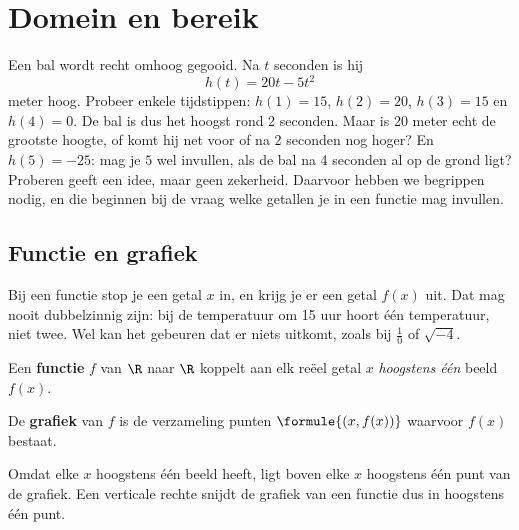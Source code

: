 \section{Domein en bereik}

Een bal wordt recht omhoog gegooid. Na $t$ seconden is hij
\[h(t) = 20t - 5t^2\]
meter hoog. Probeer enkele tijdstippen: $h(1) = 15$, $h(2) = 20$, $h(3) = 15$ en $h(4) = 0$. De bal is dus het hoogst rond 2 seconden. Maar is 20 meter echt de grootste hoogte, of komt hij net voor of na 2 seconden nog hoger? En $h(5) = -25$: mag je $5$ wel invullen, als de bal na 4 seconden al op de grond ligt? Proberen geeft een idee, maar geen zekerheid. Daarvoor hebben we begrippen nodig, en die beginnen bij de vraag welke getallen je in een functie mag invullen.

\subsection{Functie en grafiek}

Bij een functie stop je een getal $x$ in, en krijg je er een getal $f(x)$ uit. Dat mag nooit dubbelzinnig zijn: bij de temperatuur om 15 uur hoort één temperatuur, niet twee. Wel kan het gebeuren dat er niets uitkomt, zoals bij $\frac10$ of $\sqrt{-4}$.

\begin{theorie}
Een \textbf{\textcolor{accent}{functie}} $f$ van $\R$ naar $\R$ koppelt aan elk reëel getal $x$ \textit{hoogstens één} beeld $f(x)$.

De \textbf{\textcolor{accent}{grafiek}} van $f$ is de verzameling punten $\formule{(x, f(x))}$ waarvoor $f(x)$ bestaat.
\end{theorie}

Omdat elke $x$ hoogstens één beeld heeft, ligt boven elke $x$ hoogstens één punt van de grafiek. Een verticale rechte snijdt de grafiek van een functie dus in hoogstens één punt.


